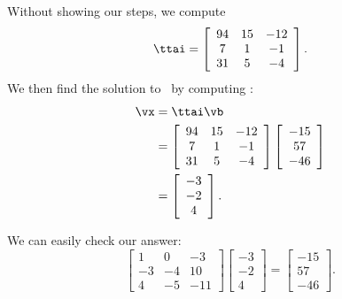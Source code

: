{Without showing our steps, we compute 
\[
\ttai = \left[ \begin {array}{ccc} 94&15&-12\\  7&1&-1
\\  31&5&-4\end {array} \right].
\]
We then find the solution to \ttaxb\ by computing \ttai\vb: \begin{align*} 
\vx &=\ttai\vb \\ 
 &= \left[ \begin {array}{ccc} 94&15&-12\\  7&1&-1
\\  31&5&-4\end {array} \right] \left[ \begin {array}{c} -15\\   57 \\  -46\end {array} \right] \\
 &= \left[ \begin {array}{c} -3\\   -2\\    4\end {array} \right].
\end{align*}

We can easily check our answer: 
\[
\left[ \begin {array}{ccc} 1&0&-3\\  -3&-4&10
\\  4&-5&-11\end {array} \right]\left[ \begin {array}{c} -3\\   -2\\    4\end {array} \right] = \left[ \begin {array}{c} -15\\   57 \\  -46\end {array} \right].
\]
\ }

